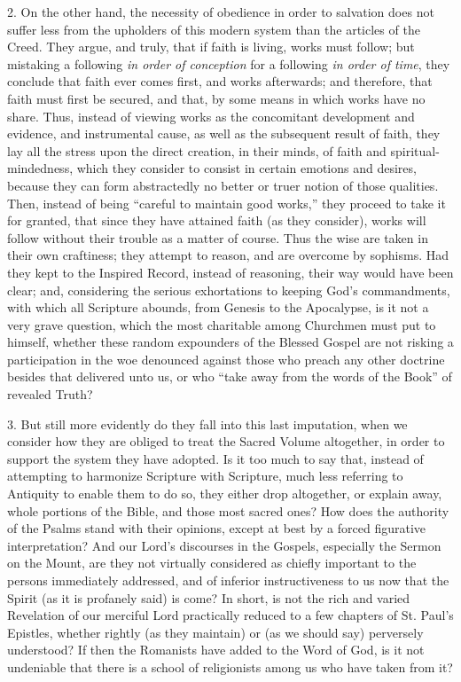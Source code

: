 2. On the other hand, the necessity of obedience in order to
salvation does not suffer less from the upholders of this modern system
than the articles of the Creed. They argue, and truly, that if faith is
living, works must follow; but mistaking a following \emph{in order of
conception} for a following \emph{in order of time}, they conclude
that faith ever comes first, and works afterwards; and therefore, that
faith must first be secured, and that, by some means in which works have
no share. Thus, instead of viewing works as the concomitant development
and evidence, and instrumental cause, as well as the subsequent result
of faith, they lay all the stress upon the direct creation, in their
minds, of faith and spiritual-mindedness, which they consider to consist
in certain emotions and desires, because they can form abstractedly no
better or truer notion of those qualities. Then, instead of being
``careful to maintain good works,'' they proceed to take it for
granted, that since they have attained faith (as they consider), works
will follow without their trouble as a matter of course. Thus the wise
are taken in their own craftiness; they attempt to reason, and are
overcome by sophisms. Had they kept to the Inspired Record, instead of
reasoning, their way would have been clear; and, considering the serious
exhortations to keeping God's commandments, with which all Scripture
abounds, from Genesis to the Apocalypse, is it not a very grave
question, which the most charitable among Churchmen must put to himself,
whether these random expounders of the Blessed Gospel are not risking a
participation in the woe denounced against those who preach any other
doctrine besides that delivered unto us, or who ``take away from the
words of the Book'' of revealed Truth?

3. But still more evidently do they fall into this last imputation,
when we consider how they are obliged to treat the Sacred Volume
altogether, in order to support the system they have adopted. Is it too
much to say that, instead of attempting to harmonize Scripture with
Scripture, much less referring to Antiquity to enable them to do so,
they either drop altogether, or explain away, whole portions of the
Bible, and those most sacred ones? How does the authority of the Psalms
stand with their opinions, except at best by a forced figurative
interpretation? And our Lord's discourses in the Gospels, especially the
Sermon on the Mount, are they not virtually considered as chiefly
important to the persons immediately addressed, and of inferior
instructiveness to us now that the Spirit (as it is profanely said) is
come? In short, is not the rich and varied Revelation of our merciful
Lord practically reduced to a few chapters of St. Paul's Epistles,
whether rightly (as they maintain) or (as we should say) perversely
understood? If then the Romanists have added to the Word of God, is it
not undeniable that there is a school of religionists among us who have
taken from it?

